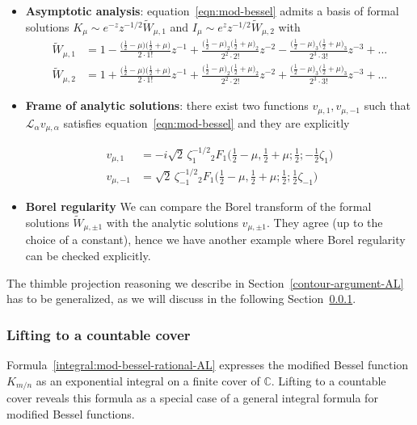 \documentclass{article}
\theoremstyle{definition}
\newcommand{\C}{\mathbb{C}}
\newcommand{\laplace}{\mathcal{L}}
\begin{document}
\begin{itemize}
 \item \textbf{Asymptotic analysis}: equation~\eqref{eqn:mod-bessel} admits a basis of formal solutions $K_{\mu}\sim e^{-z} z^{-1/2} \tilde{W}_{\mu, 1}$ and $I_{\mu} \sim e^z z^{-1/2} \tilde{W}_{\mu, 2}$ with 
 \begin{align*}
 \tilde{W}_{\mu,1} &= 1- \frac{\big(\tfrac{1}{2}-\mu\big)\big(\frac{1}{2}+\mu\big)}{2 \cdot 1!} z^{-1} + \frac{\big(\tfrac{1}{2}-\mu\big)_2\big(\frac{1}{2}+\mu\big)_2}{2^2 \cdot 2!} z^{-2} - \frac{\big(\tfrac{1}{2}-\mu\big)_3\big(\frac{1}{2}+\mu\big)_3}{2^3 \cdot 3!} z^{-3}+...\\
 \tilde{W}_{\mu,2} &= 1+\frac{\big(\tfrac{1}{2}-\mu\big)\big(\frac{1}{2}+\mu\big)}{2 \cdot 1!} z^{-1} + \frac{\big(\tfrac{1}{2}-\mu\big)_2\big(\frac{1}{2}+\mu\big)_2}{2^2 \cdot 2!} z^{-2}+ \frac{\big(\tfrac{1}{2}-\mu\big)_3\big(\frac{1}{2}+\mu\big)_3}{2^3 \cdot 3!} z^{-3} + ...
\end{align*}   
 \item  \textbf{Frame of analytic solutions}: there exist two functions $v_{\mu, 1}, v_{\mu, -1}$ such that $\laplace_{\alpha}v_{\mu, \alpha}$ satisfies equation~\eqref{eqn:mod-bessel} and they are explicitly 

\begin{align*}
v_{\mu, 1}&=-i\sqrt{2}\,\zeta_{1}^{-1/2}  {}_2F_1\big(\tfrac{1}{2}-\mu, \tfrac{1}{2}+\mu; \tfrac{1}{2}; -\tfrac{1}{2}\zeta_{1}\big)\\
v_{\mu, -1}&=\sqrt{2}\,\zeta_{-1}^{-1/2}  {}_2F_1\big(\tfrac{1}{2}-\mu, \tfrac{1}{2}+\mu; \tfrac{1}{2}; \tfrac{1}{2}\zeta_{-1}\big)
\end{align*}
\item \textbf{Borel regularity} We can compare the Borel transform of the formal solutions $\tilde{W}_{\mu,\pm1}$ with the analytic solutions $v_{\mu,\pm 1}$. They agree (up to the choice of a constant), hence we have another example where Borel regularity can be checked explicitly. 
\end{itemize}

The thimble projection reasoning we describe in Section~\ref{contour-argument-AL} has to be generalized, as we will discuss in the following Section~\ref{countable-cover}. 



\subsubsection{Lifting to a countable cover}\label{countable-cover}
Formula~\eqref{integral:mod-bessel-rational-AL} expresses the modified Bessel function $K_{m/n}$ as an exponential integral on a finite cover of $\C$. Lifting to a countable cover reveals this formula as a special case of a general integral formula for modified Bessel functions.
\end{document}
